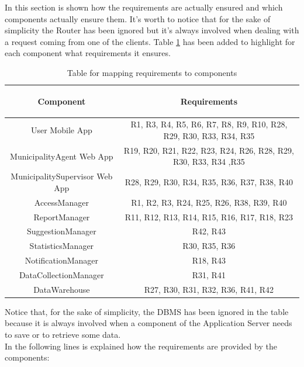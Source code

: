 \documentclass[a4paper]{report}
\begin{document}
In this section is shown how the requirements are actually ensured and which components actually ensure them. It's worth to notice that for the sake of simplicity the Router has been ignored  but it's always involved when dealing with a request coming from one of the clients. 
Table \ref{tab:req-trace} has been added to highlight for each component what requirements it ensures.
\begin{table}[H]  
  \centering
  \begin{tabular}{|c|c|}
    \cline{1-2}
   	\rule{0pt}{10pt} 
   	\begin{large}
    \textbf{Component} 
    \end{large}&\begin{large}
    \textbf{Requirements} 
    \end{large}\\  \hline
    User Mobile App &  R1, R3, R4, R5, R6, R7, R8, R9, R10, R28, R29, R30, R33, R34, R35\\ \hline
    MunicipalityAgent Web App & R19, R20, R21, R22, R23, R24, R26, R28, R29, R30, R33, R34 ,R35 \\ \hline
    MunicipalitySupervisor Web App & R28, R29, R30, R34, R35, R36, R37, R38, R40 \\ \hline
    AccessManager & R1, R2, R3, R24, R25, R26, R38, R39, R40 \\ \hline
    ReportManager & R11, R12, R13, R14, R15, R16, R17, R18, R23\\ \hline
    SuggestionManager & R42, R43 \\ \hline
    StatisticsManager & R30, R35, R36 \\ \hline
    NotificationManager & R18, R43 \\ \hline
    DataCollectionManager & R31, R41 \\ \hline
    DataWarehouse & R27, R30, R31, R32, R36, R41, R42 \\ \hline
    
  \end{tabular}
\caption{Table for mapping requirements to components} \label{tab:req-trace}
\end{table}
Notice that, for the sake of simplicity, the DBMS has been ignored in the table because it is always involved when a component of the Application Server needs to save or to retrieve some data.
\\
In the following lines is explained how the requirements are provided by the components:
\end{document}
